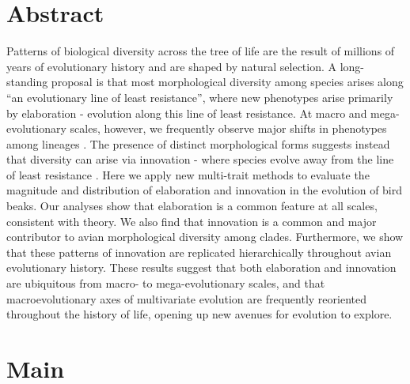\documentclass[12pt,letterpaper]{article}
\begin{document}
\section{Abstract}

Patterns of biological diversity across the tree of life are the result of millions of years of evolutionary history and are shaped by natural selection.
A long-standing proposal is that most morphological diversity among species arises along ``an evolutionary line of least resistance'', where new phenotypes arise primarily by elaboration - evolution along this line of least resistance.
At macro and mega-evolutionary scales, however, we frequently observe major shifts in phenotypes among lineages \cite{venditti2011multiple, pagel2022general}.
The presence of distinct morphological forms suggests instead that diversity can arise via innovation - where species evolve away from the line of least resistance \cite{endler2005animal, renaud2006conserved}.
Here we apply new multi-trait methods to evaluate the magnitude and distribution of elaboration and innovation in the evolution of bird beaks.
Our analyses show that elaboration is a common feature at all scales, consistent with theory.
We also find that innovation is a common and major contributor to avian morphological diversity among clades.
Furthermore, we show that these patterns of innovation are replicated hierarchically throughout avian evolutionary history.
These results suggest that both elaboration and innovation are ubiquitous from macro- to mega-evolutionary scales, and that macroevolutionary axes of multivariate evolution are frequently reoriented throughout the history of life, opening up new avenues for evolution to explore.



\section{Main}
\end{document}
